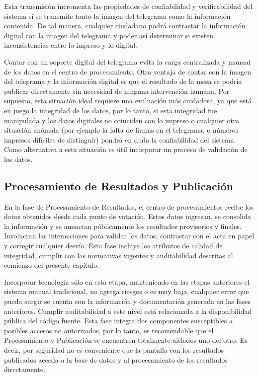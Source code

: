 Esta transmisión incrementa las propiedades de confiabilidad y verificabilidad del sistema si se transmite tanto la imagen del telegrama como la información contenida. De tal manera, cualquier ciudadano podrá contrastar la información digital con la imagen del telegrama y poder así determinar si existen inconsistencias entre lo impreso y lo digital.

Contar con un soporte digital del telegrama evita la carga centralizada y manual de los datos en el centro de procesamiento. Otra ventaja de contar con la imagen del telegrama y la información digital es que el resultado de la mesa se podría publicar directamente sin necesidad de ninguna intervención humana. Por supuesto, esta situación ideal requiere una evaluación más cuidadosa, ya que está en juego la integridad de los datos, por lo tanto, si esta integridad fue manipulada y los datos digitales no coinciden con lo impreso o cualquier otra situación anómala (por ejemplo la falta de firmas en el telegrama, o números impresos difíciles de distinguir) pondrá en duda la confiabilidad del sistema. Como alternativa a esta situación es útil incorporar un proceso de validación de los datos.


\subsection{Procesamiento de Resultados y Publicación}

En la fase de Procesamiento de Resultados, el centro de procesamientos recibe los datos obtenidos desde cada punto de votación. Estos datos ingresan, se consolida la información y se anuncian públicamente los resultados provisorios y finales. Involucran las interacciones para validar los datos, contrastar con el acta en papel y corregir cualquier desvío. Esta fase incluye los atributos de calidad de integridad, cumplir con las normativas vigentes y auditabilidad descritas al comienzo del presente capítulo. 

Incorporar tecnología sólo en esta etapa, manteniendo en las etapas anteriores el sistema manual tradicional, no agrega riesgos o es muy baja, cualquier error que pueda surgir se cuenta con la información y documentación generada en las fases anteriores. Cumplir auditabilidad a este nivel está relacionada a la disponibilidad pública del código fuente. Esta fase integra dos componentes susceptibles a posibles accesos no autorizados, por lo tanto, es recomendable que el Procesamiento y Publicación se encuentren totalmente aislados uno del otro. Es decir, por seguridad no es conveniente que la pantalla con los resultados publicados acceda a la base de datos y al procesamiento de los resultados directamente. 


